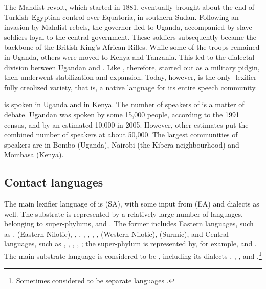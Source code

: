 \documentclass[output=paper]{langsci/langscibook}
\begin{document}
The Mahdist revolt, which started in 1881, eventually brought about the end of {Turkish}--Egyptian control over Equatoria, in southern Sudan. Following an invasion by Mahdist rebels, the governor fled to Uganda, accompanied by slave soldiers loyal to the central government. These soldiers subsequently became the backbone of the British King’s African Rifles. While some of the troops remained in Uganda, others were moved to Kenya and Tanzania. This led to the dialectal division between Ugandan and . Like  , therefore,  started out as a military {pidgin}, then underwent stabilization and expansion. Today, however,  is the only -{lexifier} fully creolized variety, that is, a native language for its entire {speech community}.

 is spoken in Uganda and in Kenya. The number of speakers of  is a matter of debate. Ugandan  was spoken by some 15,000 people, according to the 1991 census, and  by an estimated 10,000 in 2005. However, other estimates put the combined number of speakers at about 50,000. The largest communities of  speakers are in Bombo (Uganda), Nairobi (the Kibera neighbourhood) and Mombasa (Kenya).


 
 \subsection{Contact languages}


The main {lexifier} language of   is   (SA), with some input from  (EA) and  dialects as well. The {substrate} is represented by a relatively large number of languages, belonging to super-phylums,  and . The former includes {Eastern}  languages, such as ,  ({Eastern} Nilotic), , , , , , ,  (Western Nilotic),  (Surmic), and Central  languages, such as , , , , ; the  super-phylum is represented by, for example,  and . The main {substrate} language is considered to be , including its dialects , , , and .\footnote{Sometimes considered to be separate languages \citep[207]{Wellens2003}.}
\end{document}
